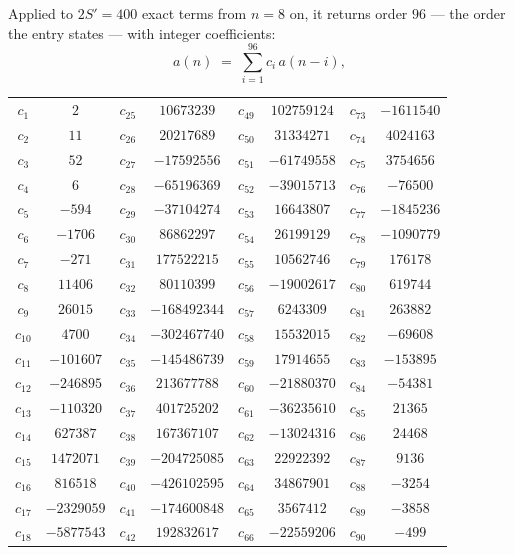 \documentclass[11pt,a4paper]{article}
\theoremstyle{plain}
\theoremstyle{definition}
\begin{document}
Applied to $2S'=400$ exact terms from $n=8$ on, it returns order $96$ --- the
order the entry states --- with integer coefficients:
\[
a(n)\;=\;\sum_{i=1}^{96}c_i\,a(n-i),
\]
\begin{center}\small
\begin{tabular}{cccccccc}
$c_{1}$ & $2$ & $c_{25}$ & $10673239$ & $c_{49}$ & $102759124$ & $c_{73}$ & $-1611540$ \\
$c_{2}$ & $11$ & $c_{26}$ & $20217689$ & $c_{50}$ & $31334271$ & $c_{74}$ & $4024163$ \\
$c_{3}$ & $52$ & $c_{27}$ & $-17592556$ & $c_{51}$ & $-61749558$ & $c_{75}$ & $3754656$ \\
$c_{4}$ & $6$ & $c_{28}$ & $-65196369$ & $c_{52}$ & $-39015713$ & $c_{76}$ & $-76500$ \\
$c_{5}$ & $-594$ & $c_{29}$ & $-37104274$ & $c_{53}$ & $16643807$ & $c_{77}$ & $-1845236$ \\
$c_{6}$ & $-1706$ & $c_{30}$ & $86862297$ & $c_{54}$ & $26199129$ & $c_{78}$ & $-1090779$ \\
$c_{7}$ & $-271$ & $c_{31}$ & $177522215$ & $c_{55}$ & $10562746$ & $c_{79}$ & $176178$ \\
$c_{8}$ & $11406$ & $c_{32}$ & $80110399$ & $c_{56}$ & $-19002617$ & $c_{80}$ & $619744$ \\
$c_{9}$ & $26015$ & $c_{33}$ & $-168492344$ & $c_{57}$ & $6243309$ & $c_{81}$ & $263882$ \\
$c_{10}$ & $4700$ & $c_{34}$ & $-302467740$ & $c_{58}$ & $15532015$ & $c_{82}$ & $-69608$ \\
$c_{11}$ & $-101607$ & $c_{35}$ & $-145486739$ & $c_{59}$ & $17914655$ & $c_{83}$ & $-153895$ \\
$c_{12}$ & $-246895$ & $c_{36}$ & $213677788$ & $c_{60}$ & $-21880370$ & $c_{84}$ & $-54381$ \\
$c_{13}$ & $-110320$ & $c_{37}$ & $401725202$ & $c_{61}$ & $-36235610$ & $c_{85}$ & $21365$ \\
$c_{14}$ & $627387$ & $c_{38}$ & $167367107$ & $c_{62}$ & $-13024316$ & $c_{86}$ & $24468$ \\
$c_{15}$ & $1472071$ & $c_{39}$ & $-204725085$ & $c_{63}$ & $22922392$ & $c_{87}$ & $9136$ \\
$c_{16}$ & $816518$ & $c_{40}$ & $-426102595$ & $c_{64}$ & $34867901$ & $c_{88}$ & $-3254$ \\
$c_{17}$ & $-2329059$ & $c_{41}$ & $-174600848$ & $c_{65}$ & $3567412$ & $c_{89}$ & $-3858$ \\
$c_{18}$ & $-5877543$ & $c_{42}$ & $192832617$ & $c_{66}$ & $-22559206$ & $c_{90}$ & $-499$ \\

\end{tabular}
\end{center}
\end{document}
